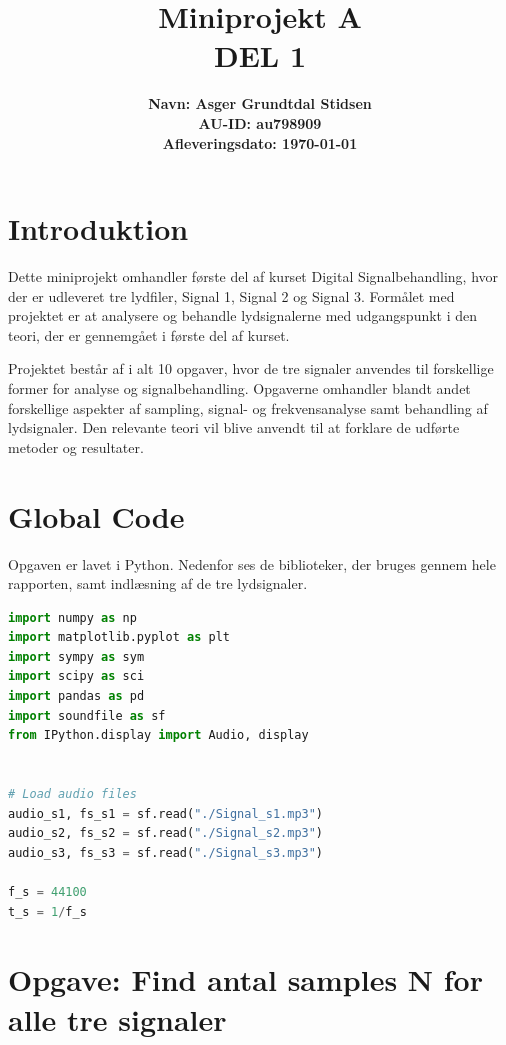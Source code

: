 \documentclass[11pt,a4paper]{report}
\title{\vspace{1cm}\Huge Miniprojekt A\\[0.3cm]\Large DEL 1}
\author{\textbf{Navn: Asger Grundtdal Stidsen} \\ \textbf{AU-ID: au798909} \\ \textbf{Afleveringsdato: \today}}
\date{}
\begin{document}
\maketitle

\section*{Introduktion}
Dette miniprojekt omhandler f\o rste del af kurset Digital Signalbehandling, hvor der er udleveret tre lydfiler, Signal 1, Signal 2 og Signal 3. Form\aa let med projektet er at analysere og behandle lydsignalerne med udgangspunkt i den teori, der er gennemg\aa et i f\o rste del af kurset.

Projektet best\aa r af i alt 10 opgaver, hvor de tre signaler anvendes til forskellige former for analyse og signalbehandling. Opgaverne omhandler blandt andet forskellige aspekter af sampling, signal- og frekvensanalyse samt behandling af lydsignaler. Den relevante teori vil blive anvendt til at forklare de udf\o rte metoder og resultater.

\tableofcontents

\clearpage
\setcounter{page}{1}

\setcounter{section}{-1}

\section{Global Code}
Opgaven er lavet i Python. Nedenfor ses de biblioteker, der bruges gennem hele rapporten, samt indlæsning af de tre lydsignaler.

\begin{lstlisting}[language=Python]
import numpy as np
import matplotlib.pyplot as plt
import sympy as sym
import scipy as sci
import pandas as pd
import soundfile as sf
from IPython.display import Audio, display


# Load audio files
audio_s1, fs_s1 = sf.read("./Signal_s1.mp3")
audio_s2, fs_s2 = sf.read("./Signal_s2.mp3")
audio_s3, fs_s3 = sf.read("./Signal_s3.mp3")

f_s = 44100
t_s = 1/f_s
\end{lstlisting}

\newpage

\section{Opgave: Find antal samples N for alle tre signaler}
\end{document}

